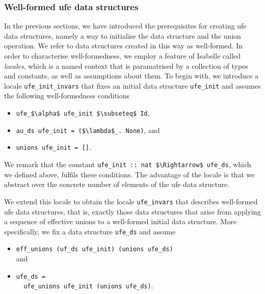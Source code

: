 \documentclass[
  sigplan,
  10pt,
  anonymous,
  review,
  ]{acmart}
\begin{document}
\subsubsection{Well-formed \acrshort{ufe} data structures}
In the previous sections, we have introduced the prerequisites for creating \acrshort{ufe} data structures,
namely a way to initialise the data structure and the union operation.
We refer to data structures created in this way as well-formed.
In order to characterise well-formedness, we employ a feature of Isabelle called \emph{locales}, which is a named context that is paramatrised by a collection of types and constants, as well as assumptions about them.
To begin with, we introduce a locale \lstinline|ufe_init_invars| that fixes an initial data structure \lstinline|ufe_init| and assumes the following well-formedness conditions
\begin{itemize}
  \item \lstinline|ufe_$\alpha$ ufe_init $\subseteq$ Id|,
  \item \lstinline|au_ds ufe_init = ($\lambda$_. None)|, and
  \item \lstinline|unions ufe_init = []|.
\end{itemize}
We remark that the constant \lstinline|ufe_init :: nat $\Rightarrow$ ufe_ds|, which we defined above, fulfils these conditions.
The advantage of the locale is that we abstract over the concrete number of elements of the \acrshort{ufe} data structure.

We extend this locale to obtain the locale \lstinline|ufe_invars| that describes well-formed \acrshort{ufe} data structures, that is, exactly those data structures that arise from applying a sequence of effective unions to a well-formed initial data structure.
More specifically, we fix a data structure \lstinline|ufe_ds| and assume
\begin{itemize}
\item \lstinline|eff_unions (uf_ds ufe_init) (unions ufe_ds)|\\and
\item \lstinline|ufe_ds =|\\\lstinline|  ufe_unions ufe_init (unions ufe_ds)|.
\end{itemize}
\end{document}
